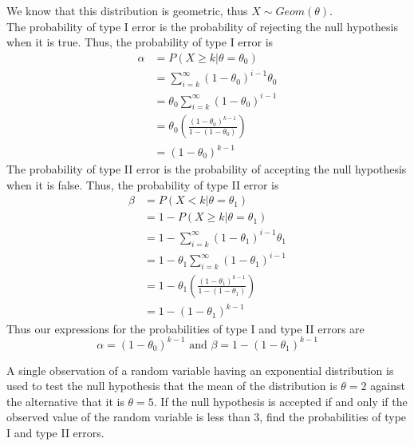 \documentclass[answers,12pt,addpoints]{exam}
\begin{document}
\begin{questions}
    \begin{solution}
        We know that this distribution is geometric, thus $X \sim Geom(\theta)$. \\
        The probability of type I error is the probability of rejecting the null hypothesis when it is true. Thus, the probability of type I error is
        \begin{align*}
            \alpha &= P(X \geq k | \theta = \theta_0) \\
            &= \sum_{i=k}^{\infty} (1-\theta_0)^{i-1} \theta_0 \\
            &= \theta_0 \sum_{i=k}^{\infty} (1-\theta_0)^{i-1} \\
            &= \theta_0 \left( \frac{(1-\theta_0)^{k-1}}{1-(1-\theta_0)} \right) \\
            &= (1-\theta_0)^{k-1}
        \end{align*}
        The probability of type II error is the probability of accepting the null hypothesis when it is false. Thus, the probability of type II error is
        \begin{align*}
            \beta &= P(X < k | \theta = \theta_1) \\
            &= 1 - P(X \geq k | \theta = \theta_1) \\
            &= 1 - \sum_{i=k}^{\infty} (1-\theta_1)^{i-1} \theta_1 \\
            &= 1 - \theta_1 \sum_{i=k}^{\infty} (1-\theta_1)^{i-1} \\
            &= 1 - \theta_1 \left( \frac{(1-\theta_1)^{k-1}}{1-(1-\theta_1)} \right) \\
            &= 1 - (1-\theta_1)^{k-1}
        \end{align*}
        Thus our expressions for the probabilities of type I and type II errors are
        \[\alpha = (1-\theta_0)^{k-1} \text{ and } \beta = 1 - (1-\theta_1)^{k-1}\]
    \end{solution}
    
    A single observation of a random variable having an exponential distribution is used to test the null hypothesis that the mean of the distribution is \(\theta = 2\) against the alternative that it is \(\theta = 5\). If the null hypothesis is accepted if and only if the observed value of the random variable is less than 3, find the probabilities of type I and type II errors.
    

\end{questions}
\end{document}
